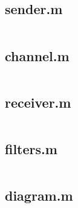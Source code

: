 \documentclass[10pt, oneside, a4paper]{article}
\begin{document}
\subsection{sender.m}
\inputminted{matlab}{../sender.m}
\label{app:sender}

\subsection{channel.m}
\inputminted{matlab}{../channel.m}
\label{app:channel}

\subsection{receiver.m}
\inputminted{matlab}{../receiver.m}
\label{app:receiver}

\subsection{filters.m}
\inputminted{matlab}{../filters.m}
\label{app:filters}

\subsection{diagram.m}
\inputminted{matlab}{../diagram.m}
\label{app:diagram}
\end{document}
